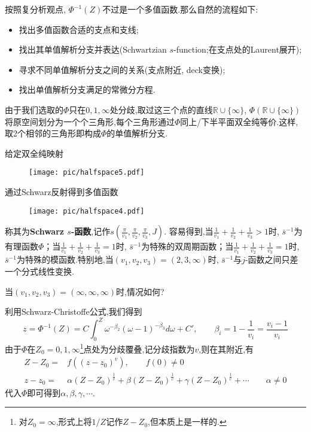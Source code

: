 按照复分析观点, $\varPhi^{-1}(Z)$不过是一个多值函数.那么自然的流程如下:
\begin{itemize}
	\item 找出多值函数合适的支点和支线;
	\item 找出其单值解析分支并表达(Schwartzian $s$-function;在支点处的Laurent展开);
	\item 寻求不同单值解析分支之间的关系(支点附近, deck变换);
	\item 找出单值解析分支满足的常微分方程.
\end{itemize}
由于我们选取的$\varPhi$只在$0,1,\infty$处分歧,取过这三个点的直线$\mathbb{R} \cup \{\infty\}$, $\varPhi\left(\mathbb{R} \cup \{\infty\}\right)$将原空间划分为一个个三角形,每个三角形通过$\varPhi$同上/下半平面双全纯等价.这样,取2个相邻的三角形即构成$\varPhi$的单值解析分支.
\begin{remark}
	给定双全纯映射
	\begin{figure}[ht]
		\begin{minipage}[t]{.9\textwidth}
			\vspace{0.1cm}
			\centering
			\texttt{[image: pic/halfspace5.pdf]}
		\end{minipage}
		\label{pic:Htriangle}
	\end{figure}
	
	通过Schwarz反射得到多值函数
	\begin{figure}[ht]
			\centering
			\texttt{[image: pic/halfspace4.pdf]}
		\label{pic:Ctriangle}
	\end{figure}
	称其为\textbf{Schwarz $s$-函数},记作$ s(\frac{\pi}{v_1},\frac{\pi}{v_2},\frac{\pi}{v_3},J)$.
	容易得到,当$\frac{1}{v_1}+\frac{1}{v_2}+\frac{1}{v_3}>1$时, $\bar{s}^{-1}$为有理函数$\varPhi$；当$\frac{1}{v_1}+\frac{1}{v_2}+\frac{1}{v_3}=1$时, $\bar{s}^{-1}$为特殊的双周期函数；当$\frac{1}{v_1}+\frac{1}{v_2}+\frac{1}{v_3}=1$时, $\bar{s}^{-1}$为特殊的模函数.特别地,当$(v_1,v_2,v_3)=(2,3,\infty)$时, $\bar{s}^{-1}$与$j$-函数之间只差一个分式线性变换.
	
\end{remark}
\begin{exercise}
	当$(v_1,v_2,v_3)=(\infty,\infty,\infty)$时,情况如何?
\end{exercise}

利用Schwarz-Christoffe公式\cite[p237]{ahlfors1979complex},我们得到
$$z=\varPhi^{-1}(Z)=C \int_{0}^{Z} \omega^{-\beta_2} (\omega-1)^{-\beta_3}d \omega +C', \qquad \beta_i=1-\frac{1}{v_i}=\frac{v_i-1}{v_i}$$
由于$\varPhi$在$Z_0=0,1,\infty$\footnote{对$Z_0=\infty$,形式上将$1/Z$记作$Z-Z_0$,但本质上是一样的.}点处为分歧覆叠,记分歧指数为$v$,则在其附近,有
\begin{equation}
\begin{aligned}
Z-Z_0 = & f\left((z-z_0)^v\right), 	\qquad f(0) \neq 0 \\
z-z_0 = & \alpha (Z-Z_0)^{\frac{1}{v}}+ \beta (Z-Z_0)^{\frac{1}{v}} + \gamma (Z-Z_0)^{\frac{1}{v}} + \cdots 	\qquad \alpha \neq 0   \label{eq:expansion}
\end{aligned}
\end{equation}
代入$\varPhi$即可得到$\alpha,\beta,\gamma,\cdots$.

